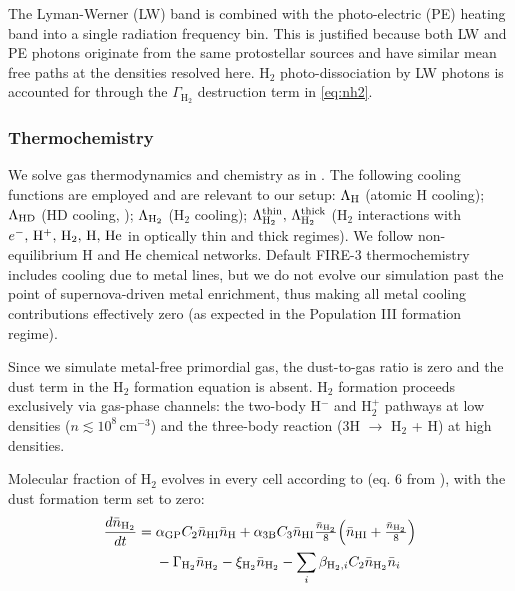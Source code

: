 \documentclass[twocolumn]{openjournal}
\begin{document}
The Lyman-Werner (LW) band is combined with the photo-electric (PE)
heating band into a single radiation frequency bin. This is justified
because both LW and PE photons originate from the same protostellar
sources and have similar mean free paths at the densities resolved here.
H$_2$ photo-dissociation by LW photons is accounted for through the
$\Gamma_{\mathrm{H_2}}$ destruction term in \autoref{eq:nh2}.

\subsubsection{Thermochemistry}
\label{sec:thermo}

We solve gas thermodynamics and chemistry as in \citep{FIRE_3_Updated_Hopkin}.
The following cooling functions are employed and are relevant to our setup:
$\Lambda_{\rm H}$ (atomic H cooling);
$\Lambda_{\rm HD}$ (HD cooling, \citealt{Galli_Palla_1998});
$\Lambda_{\rm H_2}$ (H$_2$ cooling);
$\Lambda_{\rm H_2}^{\rm thin},\, \Lambda_{\rm H_2}^{\rm thick}$
(H$_2$ interactions with $e^-,\,{\rm H}^+,\,{\rm H}_2,\,{\rm H},\,{\rm He}$
in optically thin and thick regimes).
We follow non-equilibrium H and He chemical networks.
Default FIRE-3 thermochemistry includes cooling due to metal lines, but we do
not evolve our simulation past the point of supernova-driven metal enrichment,
thus making all metal cooling contributions effectively zero (as expected in
the Population III formation regime).

Since we simulate metal-free primordial gas, the dust-to-gas ratio is zero
and the dust term in the H$_2$ formation equation is absent.
H$_2$ formation proceeds exclusively via gas-phase channels:
the two-body H$^{-}$ and H$_2^+$ pathways at low densities
($n \lesssim 10^8\,\mathrm{cm}^{-3}$) and the three-body
reaction (3H $\to$ H$_2$ + H) at high densities.

Molecular fraction of H$_2$ evolves in every cell according to (eq. 6 from
\citealt{FIRE_3_Updated_Hopkin}), with the dust formation term set to zero:
\begin{equation}
	\begin{split}
		\frac{d \bar{n}_{\rm H_2}}{dt} ={} & \alpha_{\mathrm{GP}}C_2 \bar{n}_{\rm HI} \bar{n}_{\rm H} + \alpha_{3\mathrm{B}}C_3 \bar{n}_{\rm HI}\tfrac{ \bar{n}_{\rm H_2}}{8}\!\left( \bar{n}_{\rm HI}+\tfrac{ \bar{n}_{\rm H_2}}{8}\right) \\
		                                   & - \Gamma_{\mathrm{\rm H_2}} \bar{n}_{\rm H_2} - \xi_{\mathrm{\rm H_2}} \bar{n}_{\rm H_2} - \sum_{i}\beta_{\mathrm{\rm H_2},i}C_2 \bar{n}_{\rm H_2} \bar{n}_{i}
	\end{split}
	\label{eq:nh2}
\end{equation}
\end{document}
